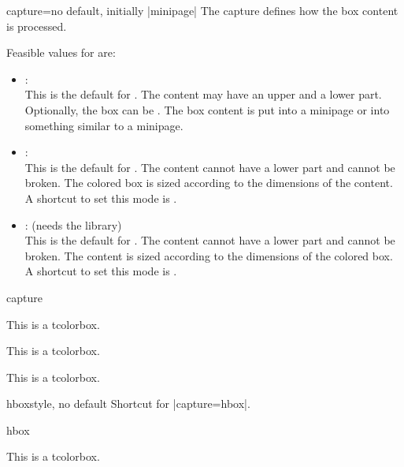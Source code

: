 \begin{docTcbKey}{capture}{=}{no default, initially |minipage|}
  The capture  defines how the box content is processed.

Feasible values for  are:
\begin{itemize}
\item{}:\\
  This is the default  for .
  The content may have an upper and a lower part. Optionally, the box
  can be . The box content is put into a
  minipage or into something similar to a minipage.
\item{}:\\
  This is the default  for . The content cannot have
  a lower part and cannot be broken. The colored box is sized according
  to the dimensions of the content.
  A shortcut to set this mode is .
\item{}: (needs the  library)\\
  This is the default  for . The content cannot have
  a lower part and cannot be broken.
  The content is sized according to the dimensions of the colored box.
  A shortcut to set this mode is .
\end{itemize}

\begin{exdispExample}{capture}

\begin{tcolorbox}[capture=minipage]
This is a tcolorbox.
\end{tcolorbox}

\begin{tcolorbox}[capture=hbox]
This is a tcolorbox.
\end{tcolorbox}

\begin{tcolorbox}[capture=fitbox,height=9mm]%
This is a tcolorbox.
\end{tcolorbox}
\end{exdispExample}
\end{docTcbKey}



\begin{docTcbKey}{hbox}{}{style, no default}
  Shortcut for |capture=hbox|.
\begin{exdispExample}{hbox}

\begin{tcolorbox}[hbox]
This is a tcolorbox.
\end{tcolorbox}
\end{exdispExample}
\end{docTcbKey}



